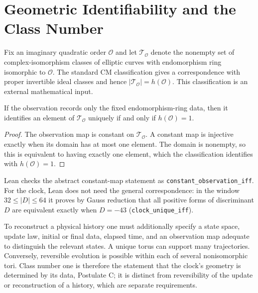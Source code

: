 \section{Geometric Identifiability and the Class Number}
\label{app:unitarity-class-number}
Fix an imaginary quadratic order $\mathcal O$ and let $\mathcal T_{\mathcal O}$ denote the nonempty set of complex-isomorphism classes of elliptic curves with endomorphism ring isomorphic to $\mathcal O$. The standard CM classification gives a correspondence with proper invertible ideal classes and hence $|\mathcal T_{\mathcal O}|=h(\mathcal O)$\cite{silverman_advanced_1994,waldschmidt_cm_2008}. This classification is an external mathematical input.

\begin{theorem}
If the observation records only the fixed endomorphism-ring data, then it identifies an element of $\mathcal T_{\mathcal O}$ uniquely if and only if $h(\mathcal O)=1$.
\end{theorem}
\begin{proof}
The observation map is constant on $\mathcal T_{\mathcal O}$. A constant map is injective exactly when its domain has at most one element. The domain is nonempty, so this is equivalent to having exactly one element, which the classification identifies with $h(\mathcal O)=1$.
\end{proof}
Lean checks the abstract constant-map statement as \texttt{constant\_observation\_iff}. For the clock, Lean does not need the general correspondence: in the window $32\le|D|\le64$ it proves by Gauss reduction that all positive forms of discriminant $D$ are equivalent exactly when $D=-43$ (\texttt{clock\_unique\_iff}).

To reconstruct a physical history one must additionally specify a state space, update law, initial or final data, elapsed time, and an observation map adequate to distinguish the relevant states. A unique torus can support many trajectories. Conversely, reversible evolution is possible within each of several nonisomorphic tori. Class number one is therefore the statement that the clock's geometry is determined by its data, Postulate C; it is distinct from reversibility of the update or reconstruction of a history, which are separate requirements.
